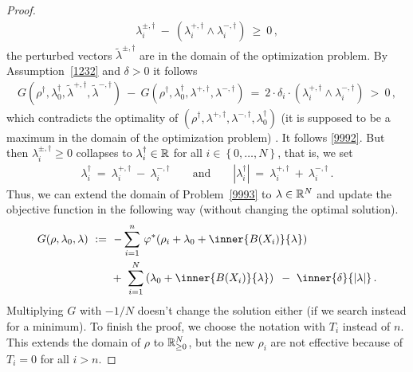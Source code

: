 \begin{proof}
\begin{gather*}
      \lambda_i^{\pm,\dagger}
      \!
      \ 
      -
      \ 
      (
      \lambda_i^{+,\dagger}
      \!
      \land
      \lambda_i^{-,\dagger}
      )
      \ 
      \ge 
      \ 
      0
      \,,
  \end{gather*}
  the perturbed vectors $\tilde{\lambda}^{\pm,\dagger}$ are  in the domain of the 
  optimization problem.
  By Assumption~\eqref{1232} and $\delta>0$ it follows
  \begin{align*}
  G
  \left( 
  \rho^\dagger,\lambda_0^\dagger,\tilde{\lambda}^{+,\dagger},\tilde{\lambda}^{-,\dagger}
  \right)
  \ 
  -
  \ 
  G
  \left( 
  \rho^\dagger,\lambda_0^\dagger,\lambda^{+,\dagger},\lambda^{-,\dagger}
  \right)
  \ 
  =
  \ 
  2
  \cdot
  \delta_i
  \cdot
      (
      \lambda_i^{+,\dagger}
      \!
      \land
      \lambda_i^{-,\dagger}
      )
  \ 
  >
  \ 
  0
  \,,
  \end{align*}
  which contradicts the optimality of
$
  (\rho^\dagger,\lambda^{+,\dagger},\lambda^{-,\dagger},\lambda_0^\dagger)
$
(it is supposed to be a maximum in the domain of the optimization problem)
.
It follows \eqref{9992}.
But then 
$
\lambda^{\pm,\dagger}_i
\ge 0
$
collapses to
$
\lambda_i^\dagger\in \mathbb{R}
$ 
for all
$i\in \left\{ 0,\ldots,N \right\}$, that is, we set
\begin{gather*}
 \lambda_i^\dagger
 \ 
 =
 \ 
 \lambda_i^{+,\dagger}
 \ 
 -
 \ 
 \lambda_i^{-,\dagger}
 \qquad
 \text{and}
 \qquad
|\lambda_i^\dagger|
\ 
=
\ 
\lambda_i^{+,\dagger}
\ 
+
\ 
\lambda_i^{-,\dagger}
\,.
\end{gather*}
Thus, we can extend the domain of Problem~\ref{9993} to $\lambda\in\mathbb{R}^{N}$ and update the objective function in the following way
(without changing the optimal solution).
\begin{align*}
  G
  (\rho,\lambda_0,\lambda)
  &
  \ 
  :=
  \ 
 -
\sum_{i=1} 
  ^n
    \,
  \varphi^*
  \!
  \left( 
    \rho_i
    +
\lambda_0
+
\inner
{B(X_i)}
{
\lambda
}
  \right)
  \\
  &
  \qquad
+
\ 
\sum_{i=1}^{N} 
  \left( 
\lambda_0
+
\inner
{B(X_i)}
{
\lambda
}
  \right)
  \,
  \ 
-
\ 
\inner
{\delta}
{
  |\lambda|
}
  \,.
\end{align*}
Multiplying $G$ with $-1/N$ doesn't change the solution either
(if we search instead for a minimum).
To finish the proof, we choose the notation with $T_i$ instead of $n$. This extends the domain of $\rho$ to $\mathbb{R}^N_{\ge 0}$, but the 
new $\rho_i$ are not effective because of $T_i=0$ for all $i>n$. 
\end{proof}
